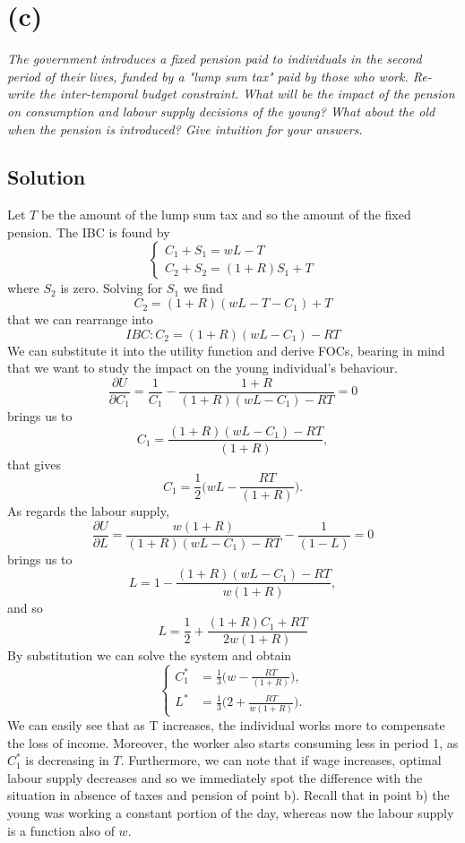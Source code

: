 \documentclass[a4paper,10pt]{report}
\begin{document}
\section*{(c)}
\textit{The government introduces a fixed pension paid to individuals in the second period
of their lives, funded by a "lump sum tax" paid by those who work. Re-write the
inter-temporal budget constraint. What will be the impact of the pension on consumption and labour supply decisions of the young? What about the old when the pension is introduced? Give intuition for your answers.}
\subsection*{Solution}
Let $ T $ be the amount of the lump sum tax and so the amount of the fixed pension. The IBC is found by 
\[
\begin{cases}
    C_1 + S_1 = wL - T \\
    C_2 + S_2 = (1+R)S_1 +T
\end{cases}
\]
where $S_2$ is zero. Solving for $S_1$ we find
\[
C_2 = (1+R)(wL-T-C_1) + T
\]
that we can rearrange into
\[
IBC: C_2 = (1+R)(wL-C_1) - RT
\]
We can substitute it into the utility function and derive FOCs, bearing in mind that we want to study the impact on the young individual's behaviour.
\[
\frac{\partial{U}}{\partial{C_1}} = \frac{1}{C_1} - \frac{1+R}{(1+R)(wL-C_1) - RT} = 0
\]
brings us to 
\[
C_1 = \frac{(1+R)(wL-C_1) - RT}{(1+R)},
\]
that gives
\begin{equation}\label{youngc}
	C_1 = \frac{1}{2}\bigg(wL-\frac{RT}{(1+R)}\bigg).
\end{equation}
As regards the labour supply,
\[
\frac{\partial{U}}{\partial{L}} = \frac{w(1+R)}{(1+R)(wL-C_1) - RT} - \frac{1}{(1-L)} = 0
\]
brings us to
\[
L = 1 - \frac{(1+R)(wL-C_1) - RT}{w(1+R)},
\]
and so
\begin{equation}\label{youngl}
	L = \frac{1}{2} + \frac{(1+R)C_1+RT}{2w(1+R)}
\end{equation}
By substitution we can solve the system and obtain
\begin{equation}\label{optimalpension}
	\begin{cases}
		C_1^* &= \frac{1}{3}\bigg(w - \frac{RT}{(1+R)}\bigg), \\
		L^* &= \frac{1}{3}\bigg(2 + \frac{RT}{w(1+R)}\bigg).
	\end{cases}
\end{equation}
We can easily see that as T increases, the individual works more to compensate the loss of income. Moreover, the worker also starts consuming less in period 1, as $ C_1^* $ is decreasing in $T$. Furthermore, we can note that if wage increases, optimal labour supply decreases and so we immediately spot the difference with the situation in absence of taxes and pension of point b). Recall that in point b) the young was working a constant portion of the day, whereas now the labour supply is a function also of $w$.
\end{document}
